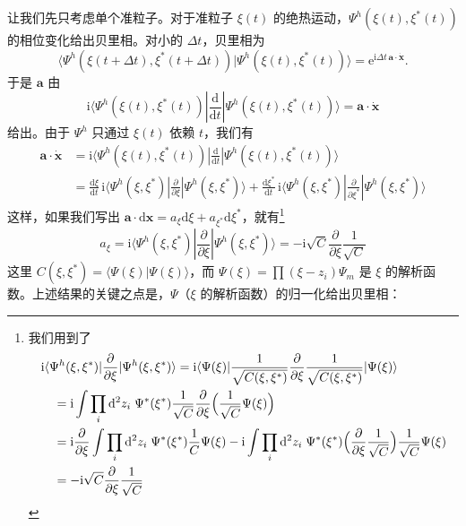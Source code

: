 让我们先只考虑单个准粒子。对于准粒子 $\xi(t)$ 的绝热运动，$\Psi^h(\xi(t),\xi^*(t))$ 的相位变化给出贝里相。对小的 $\Delta t$，贝里相为
\begin{equation*}
\langle\Psi^h(\xi(t+\Delta t),\xi^*(t+\Delta t))|\Psi^h(\xi(t),\xi^*(t))\rangle=\mathrm{e}^{\mathrm{i}\Delta t\,\pmb{a}\cdot\dot{\pmb{x}}}.
\end{equation*}
于是 $\pmb{a}$ 由
\begin{equation*}
\mathrm{i}\langle\Psi^h(\xi(t),\xi^*(t))|\frac{\mathrm{d}}{\mathrm{d}t}|\Psi^h(\xi(t),\xi^*(t))\rangle=\pmb{a}\cdot\dot{\pmb{x}}
\end{equation*}
给出。由于 $\Psi^h$ 只通过 $\xi(t)$ 依赖 $t$，我们有
\begin{align*}
\pmb{a}\cdot\dot{\pmb{x}}&=\mathrm{i}\langle\Psi^h(\xi(t),\xi^*(t))|\frac{\mathrm{d}}{\mathrm{d}t}|\Psi^h(\xi(t),\xi^*(t))\rangle\\
&=\frac{\mathrm{d}\xi}{\mathrm{d}t}\,\mathrm{i}\langle\Psi^h(\xi,\xi^*)|\frac{\partial}{\partial\xi}|\Psi^h(\xi,\xi^*)\rangle+\frac{\mathrm{d}\xi^*}{\mathrm{d}t}\,\mathrm{i}\langle\Psi^h(\xi,\xi^*)|\frac{\partial}{\partial\xi^*}|\Psi^h(\xi,\xi^*)\rangle
\end{align*}
这样，如果我们写出 $\pmb{a}\cdot\mathrm{d}\pmb{x}=a_\xi\mathrm{d}\xi+a_{\xi^*}\mathrm{d}\xi^*$，就有\footnote{我们用到了
\[
\begin{aligned}
&\mathrm{i}\langle\Psi^h(\xi,\xi^*)|\frac{\partial}{\partial\xi}|\Psi^h(\xi,\xi^*)\rangle=\mathrm{i}\langle\Psi(\xi)|\frac{1}{\sqrt{C(\xi,\xi^*)}}\frac{\partial}{\partial\xi}\frac{1}{\sqrt{C(\xi,\xi^*)}}|\Psi(\xi)\rangle\\
&\quad=\mathrm{i}\int\prod_i\mathrm{d}^2z_i\;\Psi^*(\xi^*)\frac{1}{\sqrt{C}}\frac{\partial}{\partial\xi}\Bigl(\frac{1}{\sqrt{C}}\Psi(\xi)\Bigr)\\
&\quad=\mathrm{i}\frac{\partial}{\partial\xi}\int\prod_i\mathrm{d}^2z_i\;\Psi^*(\xi^*)\frac{1}{C}\Psi(\xi)-\mathrm{i}\int\prod_i\mathrm{d}^2z_i\;\Psi^*(\xi^*)\Bigl(\frac{\partial}{\partial\xi}\frac{1}{\sqrt{C}}\Bigr)\frac{1}{\sqrt{C}}\Psi(\xi)\\
&\quad=-\mathrm{i}\sqrt{C}\frac{\partial}{\partial\xi}\frac{1}{\sqrt{C}}
\end{aligned}
\]}
\begin{equation*}
a_\xi=\mathrm{i}\langle\Psi^h(\xi,\xi^*)|\frac{\partial}{\partial\xi}|\Psi^h(\xi,\xi^*)\rangle=-\mathrm{i}\sqrt{C}\frac{\partial}{\partial\xi}\frac{1}{\sqrt{C}}
\end{equation*}
这里 $C(\xi,\xi^*)=\langle\Psi(\xi)|\Psi(\xi)\rangle$，而 $\Psi(\xi)=\prod(\xi-z_i)\Psi_m$ 是 $\xi$ 的解析函数。上述结果的关键之点是，$\Psi$（$\xi$ 的解析函数）的归一化给出贝里相：
